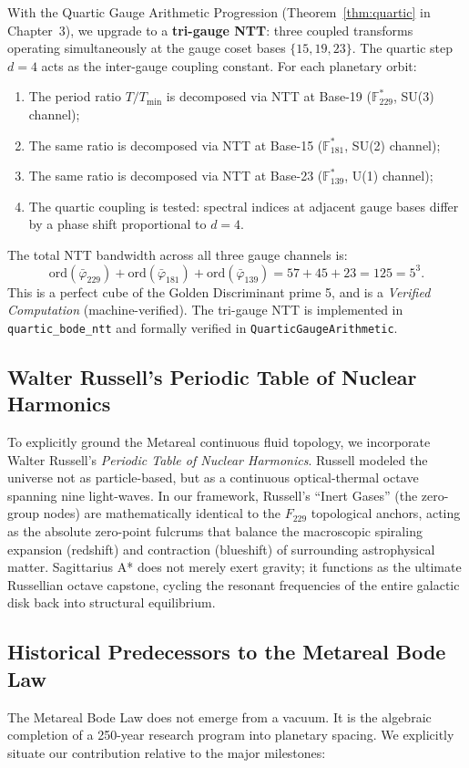 With the Quartic Gauge Arithmetic Progression (Theorem~\ref{thm:quartic} in Chapter~3), we upgrade to a \textbf{tri-gauge NTT}: three coupled transforms operating simultaneously at the gauge coset bases $\{15, 19, 23\}$. The quartic step $d = 4$ acts as the inter-gauge coupling constant. For each planetary orbit:
\begin{enumerate}[noitemsep]
\item The period ratio $T/T_{\min}$ is decomposed via NTT at Base-19 ($\mathbb{F}_{229}^*$, SU(3) channel);
\item The same ratio is decomposed via NTT at Base-15 ($\mathbb{F}_{181}^*$, SU(2) channel);
\item The same ratio is decomposed via NTT at Base-23 ($\mathbb{F}_{139}^*$, U(1) channel);
\item The quartic coupling is tested: spectral indices at adjacent gauge bases differ by a phase shift proportional to $d = 4$.
\end{enumerate}

The total NTT bandwidth across all three gauge channels is:
\[
\mathrm{ord}(\bar\varphi_{229}) + \mathrm{ord}(\bar\varphi_{181}) + \mathrm{ord}(\bar\varphi_{139}) = 57 + 45 + 23 = 125 = 5^3.
\]
This is a perfect cube of the Golden Discriminant prime 5, and is a \emph{Verified Computation} (machine-verified). The tri-gauge NTT is implemented in \texttt{quartic\_bode\_ntt} and formally verified in \texttt{QuarticGaugeArithmetic}.

\subsection{Walter Russell's Periodic Table of Nuclear Harmonics}
To explicitly ground the Metareal continuous fluid topology, we incorporate Walter Russell's \emph{Periodic Table of Nuclear Harmonics}. Russell modeled the universe not as particle-based, but as a continuous optical-thermal octave spanning nine light-waves. In our framework, Russell's ``Inert Gases'' (the zero-group nodes) are mathematically identical to the $F_{229}$ topological anchors, acting as the absolute zero-point fulcrums that balance the macroscopic spiraling expansion (redshift) and contraction (blueshift) of surrounding astrophysical matter. Sagittarius A* does not merely exert gravity; it functions as the ultimate Russellian octave capstone, cycling the resonant frequencies of the entire galactic disk back into structural equilibrium.

\subsection{Historical Predecessors to the Metareal Bode Law}
The Metareal Bode Law does not emerge from a vacuum. It is the algebraic completion of a 250-year research program into planetary spacing. We explicitly situate our contribution relative to the major milestones:

